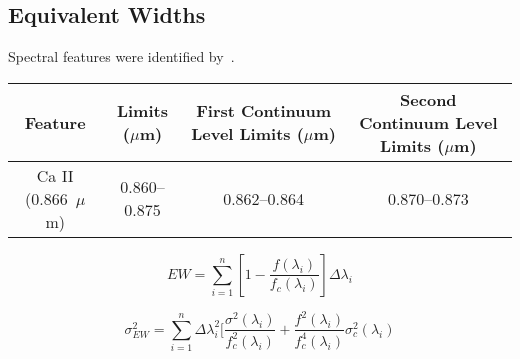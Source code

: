 \subsection{Equivalent Widths}


Spectral features were identified by~\cite{Rayner_2009}.  

\begin{table}[H]
	\begin{tabular}{c|c|c|c}
	\label{tab:features}
		Feature & Limits ($\mu$m) & First Continuum Level Limits ($\mu$m) & Second Continuum Level Limits ($\mu$m) \\ \hline
		Ca II (0.866~$\mu$m) & 0.860--0.875 & 0.862--0.864 & 0.870--0.873 \\
	\end{tabular}
\end{table}

\begin{equation}\label{eq:EW}
	EW = \sum_{i=1}^{n} [1 - \frac{f(\lambda_{i})}{f_{c}(\lambda_{i})}] \Delta\lambda_{i}
\end{equation}

\begin{equation}\label{eq:EWvar}
	\sigma_{EW}^{2} = \sum_{i=1}^{n} \Delta\lambda_{i}^{2} [\frac{\sigma^{2}(\lambda_{i})}{f_{c}^{2}(\lambda_{i})} + \frac{f^{2}(\lambda_{i})}{f_{c}^{4}(\lambda_{i})}\sigma_{c}^{2}(\lambda_{i})
\end{equation}
